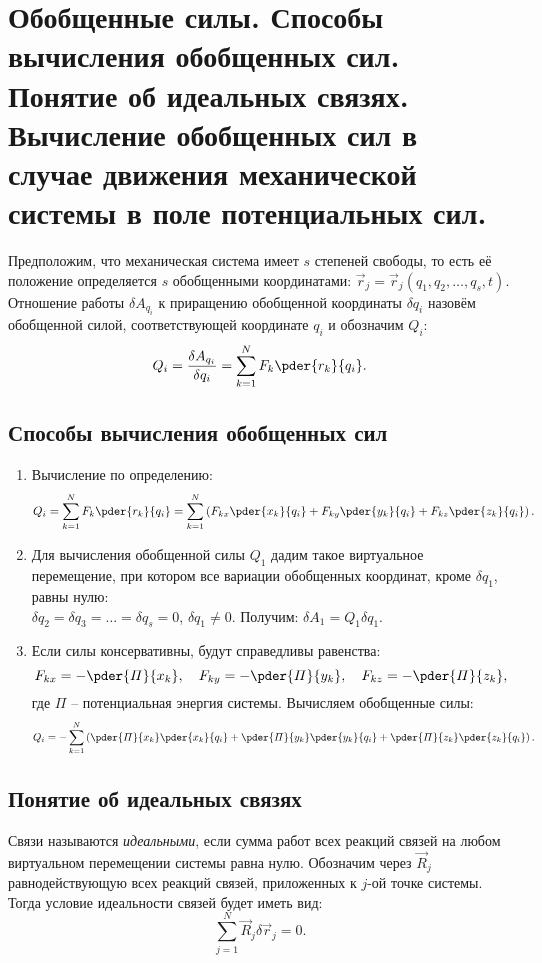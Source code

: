 \chapter{Обобщенные силы. Способы вычисления обобщенных сил. Понятие об
идеальных связях. Вычисление обобщенных сил в случае движения механической
системы в поле потенциальных сил.}

Предположим, что механическая система имеет \( s \) степеней свободы, то есть её
положение определяется \( s \) обобщенными координатами:
\( \vec{r}_j = \vec{r}_j(q_1, q_2, \ldots, q_s, t) \). Отношение работы
\( \delta A_{q_i} \) к приращению обобщенной координаты \( \delta q_i \) назовём
обобщенной силой, соответствующей координате \( q_i \) и обозначим \( Q_i \):
\[
    Q_i = \frac{\delta A_{q_i}}{\delta q_i} = \sum_{k=1}^N F_k\pder{r_k}{q_i}.
\]

\section{Способы вычисления обобщенных сил}
\begin{enumerate}
    \item Вычисление по определению:
    \[
        Q_i = \sum_{k=1}^N F_k\pder{r_k}{q_i} = \sum_{k=1}^N \left(F_{kx}
        \pder{x_k}{q_i} + F_{ky}\pder{y_k}{q_i} + F_{kz}\pder{z_k}{q_i}\right).
    \]
    
    \item Для вычисления обобщенной силы \( Q_1 \) дадим такое виртуальное
    перемещение, при котором все вариации обобщенных координат, кроме
    \( \delta q_1 \), равны нулю:\\
    \( \delta q_2 = \delta q_3 = \ldots = \delta q_s = 0 \),
    \( \delta q_1 \ne 0 \). Получим: \( \delta A_1 = Q_1\delta q_1 \).
    
    \item Если силы консервативны, будут справедливы равенства:
    \[
        F_{kx} = -\pder{\varPi}{x_k}, \quad F_{ky} = -\pder{\varPi}{y_k}, \quad
        F_{kz} = -\pder{\varPi}{z_k},
    \]
    где \( \varPi \) -- потенциальная энергия системы. Вычисляем обобщенные силы:
    \[
        Q_i = -\sum_{k=1}^N \left(\pder{\varPi}{x_k}\pder{x_k}{q_i} +
        \pder{\varPi}{y_k}\pder{y_k}{q_i} + \pder{\varPi}{z_k}\pder{z_k}{q_i}
        \right).
    \]
\end{enumerate}

\section{Понятие об идеальных связях}
Связи называются \emph{идеальными}, если сумма работ всех реакций связей на
любом виртуальном перемещении системы равна нулю. Обозначим через
\( \vec{R}_j \) равнодействующую всех реакций связей, приложенных к
\( j \)-ой точке системы. Тогда условие идеальности связей будет иметь вид:
\[
    \sum_{j=1}^N \vec{R}_j\delta\vec{r}_j = 0.
\]

\newpage
